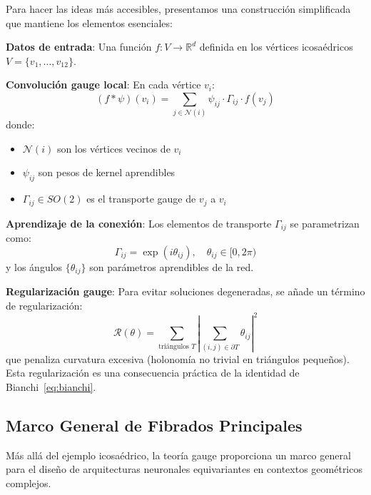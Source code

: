 \begin{theorem}
Para hacer las ideas más accesibles, presentamos una construcción simplificada que mantiene los elementos esenciales:

\textbf{Datos de entrada}: Una función $f: V \to \mathbb{R}^d$ definida en los vértices icosaédricos $V = \{v_1, \ldots, v_{12}\}$.

\textbf{Convolución gauge local}: En cada vértice $v_i$:
\begin{equation}
(f * \psi)(v_i) = \sum_{j \in \mathcal{N}(i)} \psi_{ij} \cdot \Gamma_{ij} \cdot f(v_j)
\end{equation}
donde:
\begin{itemize}
    \item $\mathcal{N}(i)$ son los vértices vecinos de $v_i$
    \item $\psi_{ij}$ son pesos de kernel aprendibles
    \item $\Gamma_{ij} \in SO(2)$ es el transporte gauge de $v_j$ a $v_i$
\end{itemize}

\textbf{Aprendizaje de la conexión}: Los elementos de transporte $\Gamma_{ij}$ se parametrizan como:
\begin{equation}
\Gamma_{ij} = \exp(i\theta_{ij}), \quad \theta_{ij} \in [0, 2\pi)
\end{equation}
y los ángulos $\{\theta_{ij}\}$ son parámetros aprendibles de la red.

\textbf{Regularización gauge}: Para evitar soluciones degeneradas, se añade un término de regularización:
\begin{equation}
\mathcal{R}(\theta) = \sum_{\text{triángulos } T} \left|\sum_{(i,j) \in \partial T} \theta_{ij}\right|^2
\end{equation}
que penaliza curvatura excesiva (holonomía no trivial en triángulos pequeños). Esta regularización es una consecuencia práctica de la identidad de Bianchi~\eqref{eq:bianchi}.
\end{theorem}

\subsection{Marco General de Fibrados Principales}

Más allá del ejemplo icosaédrico, la teoría gauge proporciona un marco general para el diseño de arquitecturas neuronales equivariantes en contextos geométricos complejos.

